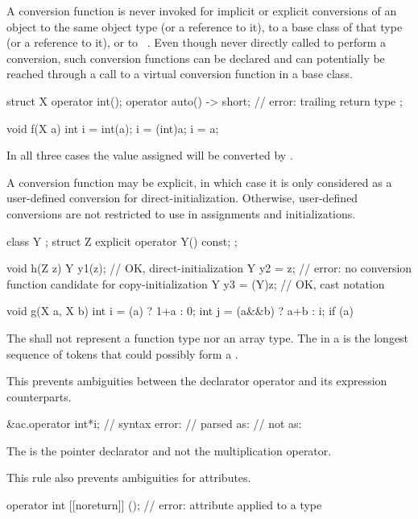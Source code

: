 \pnum
\begin{note}
A conversion function is never invoked for
implicit or explicit conversions of an object
to the same object type (or a reference to it),
to a base class of that type (or a reference to it),
or to \cv{}~.
Even though never directly called to perform a conversion,
such conversion functions can be declared and can potentially
be reached through a call to a virtual conversion function in a base class.
\end{note}
\begin{example}
\begin{codeblock}
struct X {
  operator int();
  operator auto() -> short;     // error: trailing return type
};

void f(X a) {
  int i = int(a);
  i = (int)a;
  i = a;
}
\end{codeblock}
In all three cases the value assigned will be converted by
.
\end{example}

\pnum
A conversion function may be explicit, in which case it is only considered as a user-defined conversion for direct-initialization. Otherwise, user-defined conversions are not restricted to use in assignments and initializations.
\begin{example}
\begin{codeblock}
class Y { };
struct Z {
  explicit operator Y() const;
};

void h(Z z) {
  Y y1(z);          // OK, direct-initialization
  Y y2 = z;         // error: no conversion function candidate for copy-initialization
  Y y3 = (Y)z;      // OK, cast notation
}

void g(X a, X b) {
  int i = (a) ? 1+a : 0;
  int j = (a&&b) ? a+b : i;
  if (a) {
  }
}
\end{codeblock}
\end{example}

\pnum
The
shall not represent a function type nor an array type.
The
in a
is the longest sequence of
tokens that could possibly form a .
\begin{note}
This prevents ambiguities between the declarator operator \tcode{*} and its expression
counterparts.
\begin{example}
\begin{codeblock}
&ac.operator int*i; // syntax error:
                    // parsed as: 
                    // not as: 
\end{codeblock}
The \tcode{*} is the pointer declarator and not the multiplication operator.
\end{example}
This rule also prevents ambiguities for attributes.
\begin{example}
\begin{codeblock}
operator int [[noreturn]] ();   // error:  attribute applied to a type
\end{codeblock}
\end{example}
\end{note}


